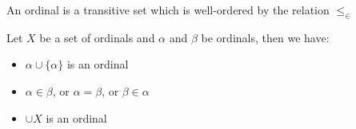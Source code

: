 \documentclass[]{article}
\begin{document}
\begin{defi} [Ordinal]
		An ordinal is a transitive set which is well-ordered by the relation $\leq_\in$
\end{defi}

\begin{thm} \label{thm:new-ordinals}
	Let $X$ be a set of ordinals and $\alpha$ and $\beta$ be ordinals, then we have:
	\begin{itemize}
			\item $\alpha \cup \{\alpha\}$ is an ordinal
			\item $\alpha \in \beta$, or $\alpha = \beta$, or $\beta \in \alpha$
			\item $\cup X$ is an ordinal
	\end{itemize}
\end{thm}
\end{document}
